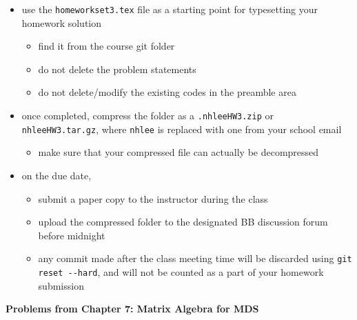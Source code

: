 \documentclass[12pt]{article}
\begin{document}
\begin{itemize}
    \item use the \verb+homeworkset3.tex+ file as a starting point for
        typesetting your homework solution
        \begin{itemize}
            \item find it from the course git folder
            \item do not delete the problem statements 
            \item do not delete/modify the existing codes in the preamble area 
        \end{itemize}
    \item once completed, compress the folder as a \verb+.nhleeHW3.zip+ or
        \verb+nhleeHW3.tar.gz+, where \verb+nhlee+ is replaced with one from your school email 
        \begin{itemize}
            \item make sure that your compressed file can actually be decompressed
        \end{itemize}
    \item on the due date, 
        \begin{itemize}
            \item submit a paper copy to the instructor during the class
            \item upload the compressed folder to the designated BB discussion
                forum before midnight
            \item any commit made after the class meeting time will be
                discarded using \verb+git reset --hard+, and will not be
                counted as a part of your homework submission
        \end{itemize}
\end{itemize}

\vskip0.25in
\begin{center}
    \textbf{Problems from Chapter 7: Matrix Algebra for MDS}
\end{center}
\end{document}
